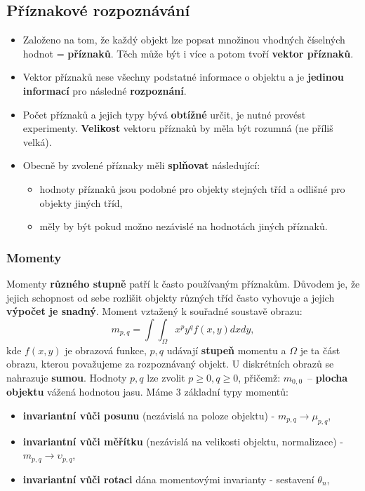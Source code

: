 \subsection{Příznakové rozpoznávání}
\begin{itemize}
\item Založeno na tom, že každý objekt lze popsat množinou vhodných číselných hodnot = \textbf{příznaků}. Těch může být i více a potom tvoří \textbf{vektor příznaků}.
\item Vektor příznaků nese všechny podstatné informace o objektu a je\textbf{ jedinou informací} pro následné \textbf{rozpoznání}.
\item Počet příznaků a jejich typy bývá \textbf{obtížné} určit, je nutné provést experimenty. \textbf{Velikost} vektoru příznaků by měla být rozumná (ne příliš velká).
\item Obecně by zvolené příznaky měli \textbf{splňovat} následující:
\begin{itemize}
\item hodnoty příznaků jsou podobné pro objekty stejných tříd a odlišné pro objekty jiných tříd,
\item měly by být pokud možno nezávislé na hodnotách jiných příznaků.
\end{itemize}
\end{itemize}

\subsubsection{Momenty}
Momenty \textbf{různého stupně} patří k často používaným příznakům. Důvodem je, že jejich schopnost od sebe rozlišit objekty různých tříd často vyhovuje a jejich \textbf{výpočet je snadný}. Moment vztažený k souřadné soustavě obrazu:
\begin{equation*}
m_{p, q} = \int{}\int_\Omega x^p y ^q f(x, y)dx dy,
\end{equation*}
kde $f(x, y)$ je obrazová funkce, $p, q$ udávají \textbf{stupeň} momentu a $\Omega$ je ta část obrazu, kterou považujeme za rozpoznávaný objekt. U diskrétních obrazů se nahrazuje \textbf{sumou}. Hodnoty $p, q$ lze zvolit $p \geq 0, q \geq 0$, přičemž: $m_{0,0}$ -- \textbf{plocha objektu} vážená hodnotou jasu. Máme 3 základní typy momentů:
\begin{itemize}
\item \textbf{invariantní vůči posunu} (nezávislá na poloze objektu) - $m_{p, q} \rightarrow \mu_{p, q}$,
\item \textbf{invariantní vůči měřítku} (nezávislá na velikosti objektu, normalizace) - $m_{p, q} \rightarrow \upsilon_{p, q}$,
\item \textbf{invariantní vůči rotaci} dána momentovými invarianty - sestavení $\theta_n$,
\end{itemize}

